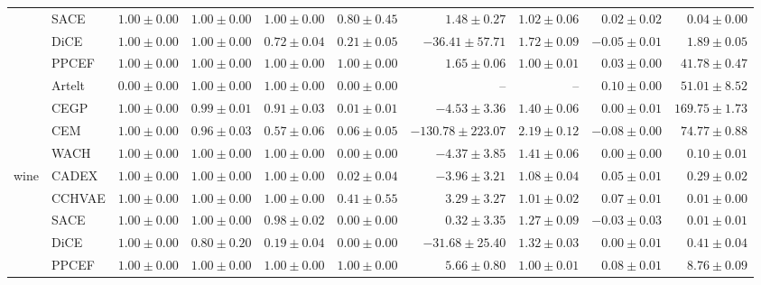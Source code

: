 \begin{table}[ht]
\begin{center}
\begin{sc}
\begin{scriptsize}
\begin{tabular}{l|l|rrrrrrrr}
 & SACE & $\boldsymbol{1.00\pm{0.00}}$ & $\boldsymbol{1.00\pm{0.00}}$ & $\boldsymbol{1.00\pm{0.00}}$ & $0.80\pm{0.45}$ & $1.48\pm{0.27}$ & $1.02\pm{0.06}$ & $0.02\pm{0.02}$ & $\boldsymbol{0.04\pm{0.00}}$ \\
 & DiCE & $\boldsymbol{1.00\pm{0.00}}$ & $\boldsymbol{1.00\pm{0.00}}$ & $0.72\pm{0.04}$ & $0.21\pm{0.05}$ & $-36.41\pm{57.71}$ & $1.72\pm{0.09}$ & $-0.05\pm{0.01}$ & $1.89\pm{0.05}$ \\
 & PPCEF & $\boldsymbol{1.00\pm{0.00}}$ & $\boldsymbol{1.00\pm{0.00}}$ & $\boldsymbol{1.00\pm{0.00}}$ & $\boldsymbol{1.00\pm{0.00}}$ & $\boldsymbol{1.65\pm{0.06}}$ & $\boldsymbol{1.00\pm{0.01}}$ & $0.03\pm{0.00}$ & $41.78\pm{0.47}$ \\
 & Artelt & $0.00\pm{0.00}$ & $\boldsymbol{1.00\pm{0.00}}$ & $\boldsymbol{1.00\pm{0.00}}$ & $0.00\pm{0.00}$ & -- & -- & $\boldsymbol{0.10\pm{0.00}}$ & $51.01\pm{8.52}$ \\
 & CEGP & $\boldsymbol{1.00\pm{0.00}}$ & $0.99\pm{0.01}$ & $0.91\pm{0.03}$ & $0.01\pm{0.01}$ & $-4.53\pm{3.36}$ & $1.40\pm{0.06}$ & $0.00\pm{0.01}$ & $169.75\pm{1.73}$ \\
 & CEM & $\boldsymbol{1.00\pm{0.00}}$ & $0.96\pm{0.03}$ & $0.57\pm{0.06}$ & $0.06\pm{0.05}$ & $-130.78\pm{223.07}$ & $2.19\pm{0.12}$ & $-0.08\pm{0.00}$ & $74.77\pm{0.88}$ \\
 & WACH & $\boldsymbol{1.00\pm{0.00}}$ & $\boldsymbol{1.00\pm{0.00}}$ & $\boldsymbol{1.00\pm{0.00}}$ & $0.00\pm{0.00}$ & $-4.37\pm{3.85}$ & $1.41\pm{0.06}$ & $0.00\pm{0.00}$ & $0.10\pm{0.01}$ \\
\midrule
\multirow{9}{*}{wine} & CADEX & $\boldsymbol{1.00\pm{0.00}}$ & $\boldsymbol{1.00\pm{0.00}}$ & $\boldsymbol{1.00\pm{0.00}}$ & $0.02\pm{0.04}$ & $-3.96\pm{3.21}$ & $1.08\pm{0.04}$ & $0.05\pm{0.01}$ & $0.29\pm{0.02}$ \\
 & CCHVAE & $\boldsymbol{1.00\pm{0.00}}$ & $\boldsymbol{1.00\pm{0.00}}$ & $\boldsymbol{1.00\pm{0.00}}$ & $0.41\pm{0.55}$ & $3.29\pm{3.27}$ & $1.01\pm{0.02}$ & $0.07\pm{0.01}$ & $\boldsymbol{0.01\pm{0.00}}$ \\
 & SACE & $\boldsymbol{1.00\pm{0.00}}$ & $\boldsymbol{1.00\pm{0.00}}$ & $0.98\pm{0.02}$ & $0.00\pm{0.00}$ & $0.32\pm{3.35}$ & $1.27\pm{0.09}$ & $-0.03\pm{0.03}$ & $\boldsymbol{0.01\pm{0.01}}$ \\
 & DiCE & $\boldsymbol{1.00\pm{0.00}}$ & $0.80\pm{0.20}$ & $0.19\pm{0.04}$ & $0.00\pm{0.00}$ & $-31.68\pm{25.40}$ & $1.32\pm{0.03}$ & $0.00\pm{0.01}$ & $0.41\pm{0.04}$ \\
 & PPCEF & $\boldsymbol{1.00\pm{0.00}}$ & $\boldsymbol{1.00\pm{0.00}}$ & $\boldsymbol{1.00\pm{0.00}}$ & $\boldsymbol{1.00\pm{0.00}}$ & $\boldsymbol{5.66\pm{0.80}}$ & $\boldsymbol{1.00\pm{0.01}}$ & $\boldsymbol{0.08\pm{0.01}}$ & $8.76\pm{0.09}$ \\

\end{tabular}
\end{scriptsize}
\end{sc}
\end{center}
\end{table}
